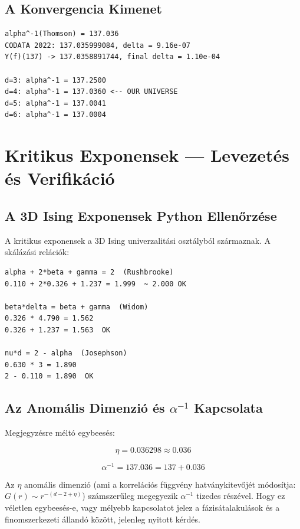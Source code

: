 \documentclass[11pt,a4paper,twoside]{book}
\begin{document}
\section{A Konvergencia Kimenet}

\begin{verbatim}
alpha^-1(Thomson) = 137.036
CODATA 2022: 137.035999084, delta = 9.16e-07
Y(f)(137) -> 137.0358891744, final delta = 1.10e-04

d=3: alpha^-1 = 137.2500
d=4: alpha^-1 = 137.0360 <-- OUR UNIVERSE
d=5: alpha^-1 = 137.0041
d=6: alpha^-1 = 137.0004
\end{verbatim}

\chapter{Kritikus Exponensek — Levezetés és Verifikáció}

\section{A 3D Ising Exponensek Python Ellenőrzése}

A kritikus exponensek a 3D Ising univerzalitási osztályból származnak. A skálázási relációk:

\begin{verbatim}
alpha + 2*beta + gamma = 2  (Rushbrooke)
0.110 + 2*0.326 + 1.237 = 1.999  ~ 2.000 OK

beta*delta = beta + gamma  (Widom)
0.326 * 4.790 = 1.562
0.326 + 1.237 = 1.563  OK

nu*d = 2 - alpha  (Josephson)
0.630 * 3 = 1.890
2 - 0.110 = 1.890  OK
\end{verbatim}

\section{Az Anomális Dimenzió és $\alpha^{-1}$ Kapcsolata}

Megjegyzésre méltó egybeesés:

\begin{equation}
\eta = 0.036298 \approx 0.036
\end{equation}

\begin{equation}
\alpha^{-1} = 137.036 = 137 + 0.036
\end{equation}

Az $\eta$ anomális dimenzió (ami a korrelációs függvény hatványkitevőjét módosítja: $G(r) \sim r^{-(d-2+\eta)}$) számszerűleg megegyezik $\alpha^{-1}$ tizedes részével. Hogy ez véletlen egybeesés-e, vagy mélyebb kapcsolatot jelez a fázisátalakulások és a finomszerkezeti állandó között, jelenleg nyitott kérdés.
\end{document}
